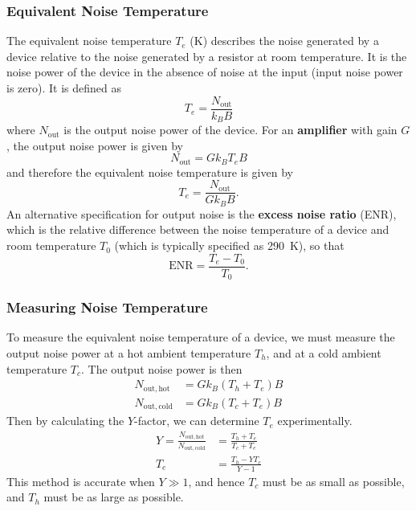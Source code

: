 \documentclass{article}
\begin{document}
\subsubsection{Equivalent Noise Temperature}
The equivalent noise temperature \(T_e\) (\unit{K}) describes the noise
generated by a device relative to the noise generated by a resistor at
room temperature. It is the noise power of the device in the absence of
noise at the input (input noise power is zero). It is defined as
\begin{equation*}
    T_e = \frac{N_\mathrm{out}}{k_B B}
\end{equation*}
where \(N_\mathrm{out}\) is the output noise power of the device. For an \textbf{amplifier}
with gain \(G\), the output noise power is given by
\begin{equation*}
    N_\mathrm{out} = G k_B T_e B
\end{equation*}
and therefore the equivalent noise temperature is given by
\begin{equation*}
    T_e = \frac{N_\mathrm{out}}{G k_B B}.
\end{equation*}
An alternative specification for output noise is the \textbf{excess
    noise ratio} (ENR), which is the relative difference between the noise
temperature of a device and room temperature \(T_0\) (which is typically
specified as \qty{290}{K}), so that
\begin{equation*}
    \mathrm{ENR} = \frac{T_e - T_0}{T_0}.
\end{equation*}
\subsubsection{Measuring Noise Temperature}
To measure the equivalent noise temperature of a device, we must
measure the output noise power at a hot ambient temperature \(T_h\),
and at a cold ambient temperature \(T_c\). The output noise power is
then
\begin{align*}
    N_{\mathrm{out,hot}}  & = G k_B \left( T_h + T_e \right) B \\
    N_{\mathrm{out,cold}} & = G k_B \left( T_c + T_e \right) B
\end{align*}
Then by calculating the \(Y\)-factor, we can determine \(T_e\)
experimentally.
\begin{align*}
    Y = \frac{N_{\mathrm{out,hot}}}{N_{\mathrm{out,cold}}} & = \frac{T_h + T_e}{T_c + T_e} \\
    T_e                                                    & = \frac{T_h - Y T_c}{Y - 1}
\end{align*}
This method is accurate when \(Y \gg 1\), and hence \(T_c\) must be as
small as possible, and \(T_h\) must be as large as possible.
\end{document}
